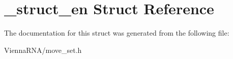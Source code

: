 \hypertarget{struct__struct__en}{\section{\-\_\-struct\-\_\-en Struct Reference}
\label{struct__struct__en}
}


The documentation for this struct was generated from the following file\-:\begin{DoxyCompactItemize}
\item 
Vienna\-R\-N\-A/move\-\_\-set.\-h\end{DoxyCompactItemize}
